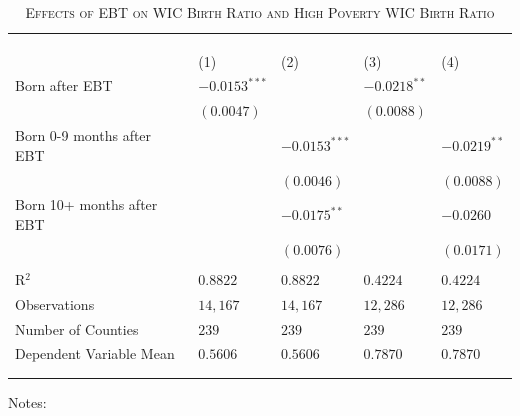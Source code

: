 \begin{table}[!htbp]
	\begin{center}
		\caption{\textsc{Effects of EBT on WIC Birth Ratio and High Poverty WIC Birth Ratio}} 
		\label{} 
		\scriptsize
		\begin{tabularx}{.75\linewidth}{@{}l*{4}{>{\centering\arraybackslash}X}@{}}
			\\[-1.8ex]\hline 
			\hline 
			\\[-1.8ex] 
			& \multicolumn{2}{c}{WIC Birth Ratio} & \multicolumn{2}{c}{High Poverty} \\
			& \multicolumn{2}{c}{} & \multicolumn{2}{c}{WIC Birth Ratio} \\
			\cmidrule(lr){2-3}\cmidrule(lr){4-5}
			& (1)     & (2)      & (3)    & (4)    \\
			\midrule
			
			Born after EBT            & $-0.0153^{***}$ &                 & $-0.0218^{**}$ &                \\
			& $(0.0047)$      &                 & $(0.0088)$     &                \\
			Born 0-9 months after EBT &                 & $-0.0153^{***}$ &                & $-0.0219^{**}$ \\
			&                 & $(0.0046)$      &                & $(0.0088)$     \\
			Born 10+ months after EBT &                 & $-0.0175^{**}$  &                & $-0.0260$      \\
			&                 & $(0.0076)$      &                & $(0.0171)$     \\
			\\
			R$^2$                  & $0.8822$        & $0.8822$        & $0.4224$       & $0.4224$       \\
			Observations              & $14,167$         & $14,167$         & $12,286$        & $12,286$        \\
			Number of Counties              & $239$         & $239$          & $239$          & $239$          \\
			Dependent Variable Mean & $0.5606$ & $0.5606$ & $0.7870$ & $0.7870$ \\
			\hline \\[-1.8ex] 
			\hline 
			\hline \\ [-5.0ex] 		
		\end{tabularx}
	\end{center}
	\footnotesize
	\vspace{4pt}
	Notes: 
\end{table}

